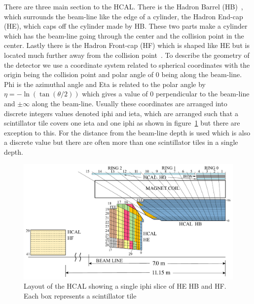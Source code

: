 There are three main section to the HCAL. There is the Hadron Barrel (HB)~\cite{HB}, which surrounds the beam-line like the edge of a cylinder, the Hadron End-cap (HE), which caps off the cylinder made by HB. These two parts make a cylinder which has the beam-line going through the center and the collision point in the center. Lastly there is the Hadron Front-cap (HF) which is shaped like HE but is located much further away from the collision point~\cite{HF}. To describe the geometry of the detector we use a coordinate system related to spherical coordinates with the origin being the collision point and polar angle of 0 being along the beam-line. Phi is the azimuthal angle and Eta is related to the polar angle by $\eta = -\ln(\tan(\theta/2))$ which gives a value of 0 perpendicular to the beam-line and $\pm\infty$ along the beam-line. Usually these coordinates are arranged into discrete integers values denoted iphi and ieta, which are arranged such that a scintillator tile covers one ieta and one iphi as shown in figure~\ref{fig:Depth} but there are exception to this. For the distance from the beam-line depth is used which is also a discrete value but there are often more than one scintillator tiles in a single depth. 


\begin{figure}
\centering
\includegraphics[width=\linewidth]{Figures/Depthsegmentation.pdf}
\caption{Layout of the HCAL showing a single iphi slice of HE HB and HF. Each box represents a scintillator tile}
\label{fig:Depth}
\end{figure}

